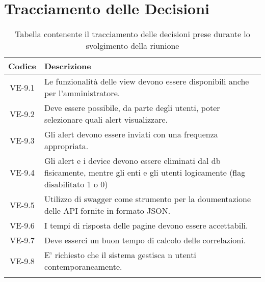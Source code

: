 \section*{Tracciamento delle Decisioni}

\begin{center}
	\begin{longtable}{|c|p{14.5cm}|}
	\hline
	\rowcolor{lighter-grayer}
	\textbf{Codice} & \textbf{Descrizione} \\
	\hline
	\endfirsthead
	
	\hline
	VE-9.1 & Le funzionalità delle view devono essere disponibili anche per l'amministratore. \\
	\hline
	VE-9.2 & Deve essere possibile, da parte degli utenti, poter selezionare quali alert visualizzare. \\
	\hline
	VE-9.3 & Gli alert devono essere inviati con una frequenza appropriata. \\
	\hline
	VE-9.4 & Gli alert e i device devono essere eliminati dal db fisicamente, mentre gli enti e gli utenti logicamente (flag disabilitato 1 o 0) \\
	\hline
	VE-9.5 & Utilizzo di swagger come strumento per la doumentazione delle API fornite in formato JSON. \\
	\hline
	VE-9.6 & I tempi di risposta delle pagine devono essere accettabili. \\
	\hline
	VE-9.7 & Deve esserci un buon tempo di calcolo delle correlazioni. \\
	\hline
	VE-9.8 & E' richiesto che il sistema gestisca n utenti contemporaneamente. \\
	\hline
	\caption{Tabella contenente il tracciamento delle decisioni prese durante lo svolgimento della riunione}
	\end{longtable}
\end{center}